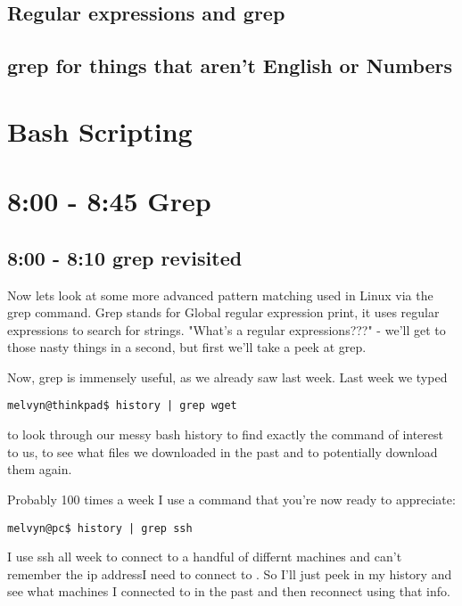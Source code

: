 \documentclass[12pt,a4paper]{article}
\begin{document}
\subsection{Regular expressions and grep}

\subsection{grep for things that aren't English or Numbers}

\section{Bash Scripting}




\section{8:00 - 8:45 Grep}
\subsection{8:00 - 8:10 grep revisited}
Now lets look at some more advanced pattern matching used in Linux via the grep command. 
Grep stands for Global regular expression print, it uses regular expressions to search for strings. "What's a regular expressions???" - we'll get to those nasty things in a second, but first we'll take a peek at grep.

Now, grep is immensely useful, as we already saw last week. Last week we typed

\begin{lstlisting}[style=term]
melvyn@thinkpad$ history | grep wget
\end{lstlisting}

to look through our messy bash history to find exactly the command of interest to us, to see what files we downloaded in the past and to potentially download them again.

Probably  100 times a week I use a command that you're now ready to appreciate:

\begin{lstlisting}
melvyn@pc$ history | grep ssh
\end{lstlisting}

I use ssh all week to connect to a handful of differnt machines and can't
remember the ip addressI need to connect to . So I'll just peek in my history
and see what machines I connected to in the past and then reconnect using that
info.
\end{document}

